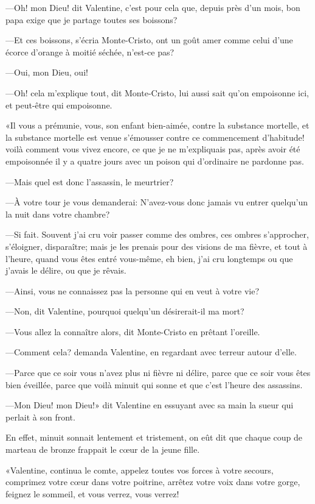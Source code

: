 —Oh! mon Dieu! dit Valentine, c'est pour cela que, depuis près d'un mois, bon papa exige que je partage toutes ses boissons? 

—Et ces boissons, s'écria Monte-Cristo, ont un goût amer comme celui d'une écorce d'orange à moitié séchée, n'est-ce pas? 

—Oui, mon Dieu, oui! 

—Oh! cela m'explique tout, dit Monte-Cristo, lui aussi sait qu'on empoisonne ici, et peut-être qui empoisonne. 

«Il vous a prémunie, vous, son enfant bien-aimée, contre la substance mortelle, et la substance mortelle est venue s'émousser contre ce commencement d'habitude! voilà comment vous vivez encore, ce que je ne m'expliquais pas, après avoir été empoisonnée il y a quatre jours avec un poison qui d'ordinaire ne pardonne pas. 

—Mais quel est donc l'assassin, le meurtrier? 

—À votre tour je vous demanderai: N'avez-vous donc jamais vu entrer quelqu'un la nuit dans votre chambre? 

—Si fait. Souvent j'ai cru voir passer comme des ombres, ces ombres s'approcher, s'éloigner, disparaître; mais je les prenais pour des visions de ma fièvre, et tout à l'heure, quand vous êtes entré vous-même, eh bien, j'ai cru longtemps ou que j'avais le délire, ou que je rêvais. 

—Ainsi, vous ne connaissez pas la personne qui en veut à votre vie? 

—Non, dit Valentine, pourquoi quelqu'un désirerait-il ma mort? 

—Vous allez la connaître alors, dit Monte-Cristo en prêtant l'oreille. 

—Comment cela? demanda Valentine, en regardant avec terreur autour d'elle. 

—Parce que ce soir vous n'avez plus ni fièvre ni délire, parce que ce soir vous êtes bien éveillée, parce que voilà minuit qui sonne et que c'est l'heure des assassins. 

—Mon Dieu! mon Dieu!» dit Valentine en essuyant avec sa main la sueur qui perlait à son front. 

En effet, minuit sonnait lentement et tristement, on eût dit que chaque coup de marteau de bronze frappait le cœur de la jeune fille. 

«Valentine, continua le comte, appelez toutes vos forces à votre secours, comprimez votre cœur dans votre poitrine, arrêtez votre voix dans votre gorge, feignez le sommeil, et vous verrez, vous verrez! 

